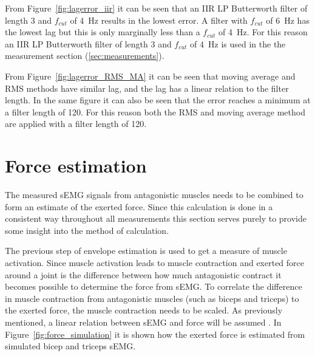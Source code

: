 From Figure~\ref{fig:lagerror_iir} it can be seen that an IIR LP Butterworth filter of length 3 and $f_{cut}$ of \SI{4}{\hertz} results in the lowest error. A filter with $f_{cut}$ of \SI{6}{\hertz} has the lowest lag but this is only marginally less than a $f_{cut}$ of \SI{4}{\hertz}. For this reason an IIR LP Butterworth filter of length 3 and $f_{cut}$ of \SI{4}{\hertz} is used in the the measurement section (\ref{sec:measurements}).

From Figure~\ref{fig:lagerror_RMS_MA} it can be seen that moving average and RMS methods have similar lag, and the lag has a linear relation to the filter length. In the same figure it can also be seen that the error reaches a minimum at a filter length of 120. For this reason both the RMS and moving average method are applied with a filter length of 120.

\section{Force estimation}\label{section:force_estimation}
The measured sEMG signals from antagonistic muscles needs to be combined to form an estimate of the exerted force. Since this calculation is done in a consistent way throughout all measurements this section serves purely to provide some insight into the method of calculation.

The previous step of envelope estimation is used to get a measure of muscle activation. Since muscle activation leads to muscle contraction and exerted force around a joint is the difference between how much antagonistic contract \cite{human_robotics} it becomes possible to determine the force from sEMG. To correlate the difference in muscle contraction from antagonistic muscles (such as biceps and triceps) to the exerted force, the muscle contraction needs to be scaled. As previously mentioned, a linear relation between sEMG and force will be assumed \cite{adaptive_filter_dry_electrode} \cite{interpreting_muscle_function_from_emg}. In Figure~\ref{fig:force_simulation} it is shown how the exerted force is estimated from simulated bicep and triceps sEMG. 

